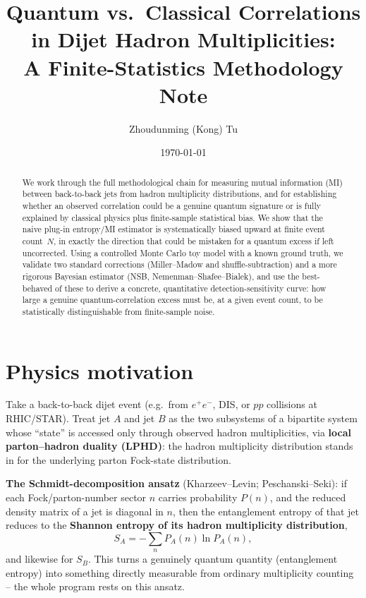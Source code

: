 \documentclass[11pt]{article}
\title{Quantum vs.\ Classical Correlations in Dijet Hadron Multiplicities:\\
A Finite-Statistics Methodology Note}
\author[1,2]{Zhoudunming (Kong) Tu}
\affil[1]{Brookhaven National Laboratory}
\affil[2]{Stony Brook University}
\date{\today}
\begin{document}
\maketitle

\begin{abstract}
\noindent
We work through the full methodological chain for measuring mutual
information (MI) between back-to-back jets from hadron multiplicity
distributions, and for establishing whether an observed correlation could
be a genuine quantum signature or is fully explained by classical physics
plus finite-sample statistical bias. We show that the naive plug-in
entropy/MI estimator is systematically biased upward at finite event
count~$N$, in exactly the direction that could be mistaken for a quantum
excess if left uncorrected. Using a controlled Monte Carlo toy model with
a known ground truth, we validate two standard corrections (Miller--Madow
and shuffle-subtraction) and a more rigorous Bayesian estimator (NSB,
Nemenman--Shafee--Bialek), and use the best-behaved of these to derive a
concrete, quantitative detection-sensitivity curve: how large a genuine
quantum-correlation excess must be, at a given event count, to be
statistically distinguishable from finite-sample noise.
\end{abstract}

\tableofcontents

\section{Physics motivation}

Take a back-to-back dijet event (e.g.\ from $e^+e^-$, DIS, or $pp$
collisions at RHIC/STAR). Treat jet $A$ and jet $B$ as the two subsystems
of a bipartite system whose ``state'' is accessed only through observed
hadron multiplicities, via \textbf{local parton--hadron duality (LPHD)}:
the hadron multiplicity distribution stands in for the underlying parton
Fock-state distribution.

\textbf{The Schmidt-decomposition ansatz} (Kharzeev--Levin;
Peschanski--Seki): if each Fock/parton-number sector $n$ carries
probability $P(n)$, and the reduced density matrix of a jet is diagonal in
$n$, then the entanglement entropy of that jet reduces to the
\textbf{Shannon entropy of its hadron multiplicity distribution},
\begin{equation}
S_A = -\sum_n P_A(n)\ln P_A(n),
\end{equation}
and likewise for $S_B$. This turns a genuinely quantum quantity
(entanglement entropy) into something directly measurable from ordinary
multiplicity counting -- the whole program rests on this ansatz.
\end{document}
